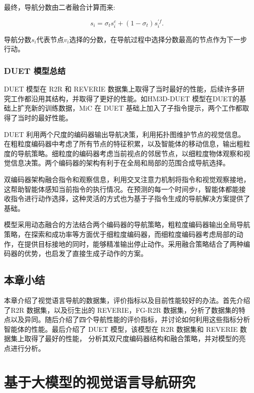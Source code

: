 \documentclass[bachelor]{thesis-uestc}
\begin{document}
最终，导航分数由二者融合计算而来:

\begin{equation}
    s_i = \sigma_t s^c_i + (1 - \sigma_t) s^{\prime f}_i.
\label{sce}
\end{equation}

导航分数$s_i$代表节点$v_i$选择的分数，在导航过程中选择分数最高的节点作为下一步行动。

\subsection{DUET 模型总结}
DUET 模型在 R2R 和 REVERIE 数据集上取得了当时最好的性能，后续许多研究工作都沿用其结构，并取得了更好的性能。如HM3D-DUET 模型在DUET的基础上扩充新的训练数据，MiC 在 DUET 基础上加入了子指令提示，两个工作都取得了当时的最好性能。

DUET 利用两个尺度的编码器输出导航决策，利用拓扑图维护节点的视觉信息。在粗粒度编码器中考虑了所有节点的特征积累，以及智能体的移动信息，输出粗粒度的导航策略。细粒度的编码器考虑当前视点的邻居节点，以细粒度物体观察和视觉信息决策。两个编码器的架构有利于在全局和局部的范围合成导航选择。

双编码器架构融合指令和观察信息，利用交叉注意力机制将指令和视觉观察接地，这帮助智能体感知当前指令的执行情况。在预测的每一个时间步$t$，智能体都能接收指令进行动作选择，这种灵活的方式也为基于子指令生成的导航解决方案提供了基础。

模型采用动态融合的方法结合两个编码器的导航策略，粗粒度编码器输出全局导航策略，在探索和成功率等方面优于细粒度编码器，而细粒度编码器考虑局部的动作，在提供目标接地的同时，能够精准输出停止动作。采用融合策略结合了两种编码器的优势，也启发了直接生成子动作的方案。

\section{本章小结}

本章介绍了视觉语言导航的数据集，评价指标以及目前性能较好的办法。首先介绍了R2R 数据集，以及衍生出的 REVERIE，FG-R2R 数据集，分析了数据集的特点以及异同。随后介绍了四个导航性能的评价指标，并讨论如何利用这些指标分析智能体的性能。最后介绍了 DUET 模型，该模型在 R2R 数据集和 REVERIE 数据集上取得了最好的性能， 分析其双尺度编码器结构和融合策略，并对模型的亮点进行分析。


\chapter{基于大模型的视觉语言导航研究}
\end{document}
